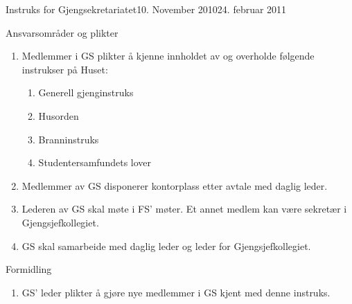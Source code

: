 \begin{instruks}{Instruks for Gjengsekretariatet}{10. November 2010}{24. februar 2011}
    \begin{instruksledd}{Ansvarsområder og plikter}
        \begin{enumerate}
            \item Medlemmer i GS plikter å kjenne innholdet av og overholde følgende instrukser på Huset:
                \begin{enumerate}
                    \item Generell gjenginstruks
                    \item Husorden
                    \item Branninstruks
                    \item Studentersamfundets lover
                \end{enumerate}
            \item Medlemmer av GS disponerer kontorplass etter avtale med daglig leder.
            \item Lederen av GS skal møte i FS' møter. Et annet medlem kan være sekretær i
Gjengsjefkollegiet.
            \item GS skal samarbeide med daglig leder og leder for Gjengsjefkollegiet.
        \end{enumerate}
    \end{instruksledd}

    \begin{instruksledd}{Formidling}
        \begin{enumerate}
            \item GS' leder plikter å gjøre nye medlemmer i GS kjent med denne instruks.
        \end{enumerate}
    \end{instruksledd}


\end{instruks}
